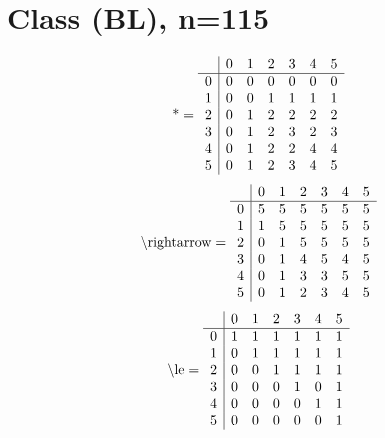 \documentclass[11pt]{article}
\begin{document}
\section{Class (BL), n=115}
\[\text{*} = 
\begin{array}{r | r r r r r r}
 & 0 & 1 & 2 & 3 & 4 & 5 \\ \hline
0 & 0 & 0 & 0 & 0 & 0 & 0 \\
1 & 0 & 0 & 1 & 1 & 1 & 1 \\
2 & 0 & 1 & 2 & 2 & 2 & 2 \\
3 & 0 & 1 & 2 & 3 & 2 & 3 \\
4 & 0 & 1 & 2 & 2 & 4 & 4 \\
5 & 0 & 1 & 2 & 3 & 4 & 5 \\
\end{array}
\]
\[\text{\textbackslash rightarrow} = 
\begin{array}{r | r r r r r r}
 & 0 & 1 & 2 & 3 & 4 & 5 \\ \hline
0 & 5 & 5 & 5 & 5 & 5 & 5 \\
1 & 1 & 5 & 5 & 5 & 5 & 5 \\
2 & 0 & 1 & 5 & 5 & 5 & 5 \\
3 & 0 & 1 & 4 & 5 & 4 & 5 \\
4 & 0 & 1 & 3 & 3 & 5 & 5 \\
5 & 0 & 1 & 2 & 3 & 4 & 5 \\
\end{array}
\]
\[\text{\textbackslash le} = 
\begin{array}{r | r r r r r r}
 & 0 & 1 & 2 & 3 & 4 & 5 \\ \hline
0 & 1 & 1 & 1 & 1 & 1 & 1 \\
1 & 0 & 1 & 1 & 1 & 1 & 1 \\
2 & 0 & 0 & 1 & 1 & 1 & 1 \\
3 & 0 & 0 & 0 & 1 & 0 & 1 \\
4 & 0 & 0 & 0 & 0 & 1 & 1 \\
5 & 0 & 0 & 0 & 0 & 0 & 1 \\
\end{array}
\]
\end{document}

